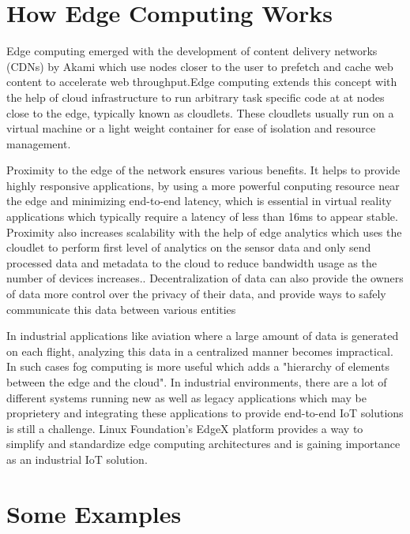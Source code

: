 \documentclass[sigconf]{acmart}
\begin{document}
\section{How Edge Computing Works}
Edge computing emerged with the development of content delivery networks (CDNs) by Akami which use nodes closer to the user to prefetch and cache web content to accelerate web throughput.Edge computing extends this concept with the help of cloud infrastructure to run arbitrary task specific code at at nodes close to the edge, typically known as cloudlets. These cloudlets usually run on a virtual machine or a light weight container for ease of isolation and resource management.\cite{satyanarayananemergence}

Proximity to the edge of the network ensures various benefits. It helps to provide highly responsive applications, by using a more powerful conputing resource near the edge and minimizing end-to-end latency, which is essential in virtual reality applications which typically require a latency of less than 16ms to appear stable.\cite{rocket-real-time-video}\cite{satyanarayananemergence} Proximity also increases scalability with the help of edge analytics which uses the cloudlet to perform first level of analytics on the sensor data and only send processed data and metadata to the cloud to reduce bandwidth usage as the number of devices increases.\cite{satyanarayananemergence}.  Decentralization of data can also provide the owners of data more control over the privacy of their data, and provide ways to safely communicate this data between various entities\cite{ibm_iot_edge}

In industrial applications like aviation where a large amount of data is generated on each flight\cite{satyanarayananemergence}, analyzing this data in a centralized manner becomes impractical. In such cases fog computing is more useful which adds a "hierarchy of elements between the edge and the cloud"\cite{rt_insights_iiot}. In industrial environments, there are a lot of different systems running new as well as legacy applications which may be proprietery and integrating these applications to provide end-to-end IoT solutions is still a challenge. Linux Foundation's EdgeX platform provides a way to simplify and standardize edge computing architectures and is gaining importance as an industrial IoT solution.\cite{rt_insights_iiot}


\section{Some Examples}
\end{document}
